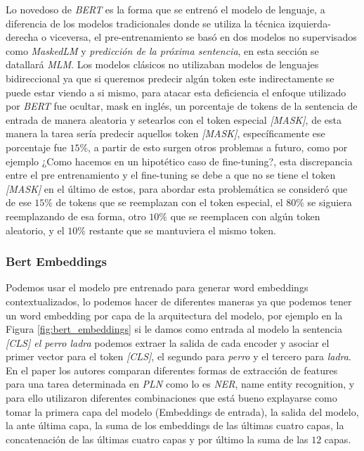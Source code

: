Lo novedoso de \textit{BERT} es la forma que se entrenó el modelo de lenguaje, a diferencia de los modelos tradicionales donde se utiliza la técnica izquierda-derecha o viceversa, el pre-entrenamiento se basó en dos modelos no supervisados como \textit{MaskedLM} y \textit{predicción de la próxima sentencia}, en esta sección se datallará \textit{MLM}.
Los modelos clásicos no utilizaban modelos de lenguajes bidireccional ya que si queremos predecir algún token este indirectamente se puede estar viendo a si mismo, para atacar esta deficiencia el enfoque utilizado por \textit{BERT} fue ocultar, mask en inglés, un porcentaje de tokens de la sentencia de entrada de manera aleatoria y setearlos con el token especial \textit{[MASK]}, de esta manera la tarea sería predecir aquellos token \textit{[MASK]}, específicamente ese porcentaje fue $15\%$, a partir de esto surgen otros problemas a futuro, como por ejemplo ¿Como hacemos en un hipotético caso de fine-tuning?, esta discrepancia entre el pre entrenamiento y el fine-tuning se debe a que no se tiene el token \textit{[MASK]} en el último de estos, para abordar esta problemática se consideró que de ese $15\%$ de tokens que se reemplazan con el token especial, el $80\%$ se siguiera reemplazando de esa forma, otro $10\%$ que se reemplacen con algún token aleatorio, y el $10\%$ restante que se mantuviera el mismo token.

\subsubsection{Bert Embeddings} \label{sec:bert_emb}

Podemos usar el modelo pre entrenado para generar word embeddings contextualizados, lo podemos hacer de diferentes maneras ya que podemos tener un word embedding por capa de la arquitectura del modelo, por ejemplo en la Figura \ref{fig:bert_embeddings} si le damos como entrada al modelo la sentencia \textit{[CLS] el perro ladra} podemos extraer la salida de cada encoder y asociar el primer vector para el token \textit{[CLS]}, el segundo para \textit{perro} y el tercero para \textit{ladra}. En el paper \cite{devlin2018bert} los autores comparan diferentes formas de extracción de features para una tarea determinada en \textit{PLN} como lo es \textit{NER}, name entity recognition, y para ello utilizaron diferentes combinaciones que está bueno explayarse como tomar la primera capa del modelo (Embeddings de entrada), la salida del modelo, la ante última capa, la suma de los embeddings de las últimas cuatro capas, la concatenación de las últimas cuatro capas y por último la suma de las $12$ capas.


